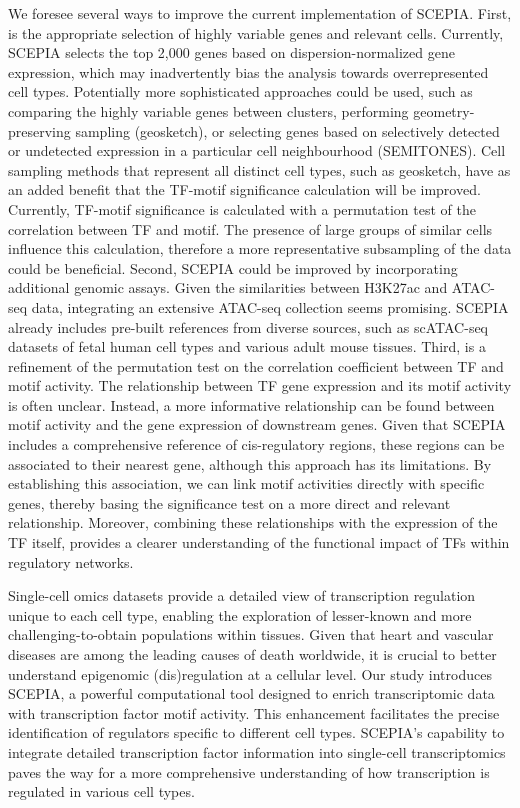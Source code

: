 We foresee several ways to improve the current implementation of SCEPIA. First, is the appropriate selection of highly variable genes and relevant cells. Currently, SCEPIA selects the top 2,000 genes based on dispersion-normalized gene expression, which may inadvertently bias the analysis towards overrepresented cell types. Potentially more sophisticated approaches could be used, such as comparing the highly variable genes between clusters, performing geometry-preserving sampling (geosketch)\cite{Hie2019}, or selecting genes based on selectively detected or undetected expression in a particular cell neighbourhood (SEMITONES)\cite{Vlot2022}. Cell sampling methods that represent all distinct cell types, such as geosketch, have as an added benefit that the TF-motif significance calculation will be improved. Currently, TF-motif significance is calculated with a permutation test of the correlation between TF and motif. The presence of large groups of similar cells influence this calculation, therefore a more representative subsampling of the data could be beneficial. Second, SCEPIA could be improved by incorporating additional genomic assays. Given the similarities between H3K27ac and ATAC-seq data, integrating an extensive ATAC-seq collection seems promising. SCEPIA already includes pre-built references from diverse sources, such as scATAC-seq datasets of fetal human cell types\cite{Domcke2020} and various adult mouse tissues\cite{Cusanovich2018}. Third, is a refinement of the permutation test on the correlation coefficient between TF and motif activity. The relationship between TF gene expression and its motif activity is often unclear. Instead, a more informative relationship can be found between motif activity and the gene expression of downstream genes. Given that SCEPIA includes a comprehensive reference of cis-regulatory regions, these regions can be associated to their nearest gene, although this approach has its limitations\cite{Fulco_2019}. By establishing this association, we can link motif activities directly with specific genes, thereby basing the significance test on a more direct and relevant relationship. Moreover, combining these relationships with the expression of the TF itself, provides a clearer understanding of the functional impact of TFs within regulatory networks.

Single-cell omics datasets provide a detailed view of transcription regulation unique to each cell type, enabling the exploration of lesser-known and more challenging-to-obtain populations within tissues. Given that heart and vascular diseases are among the leading causes of death worldwide\cite{Tsao2023}, it is crucial to better understand epigenomic (dis)regulation at a cellular level. Our study introduces SCEPIA, a powerful computational tool designed to enrich transcriptomic data with transcription factor motif activity. This enhancement facilitates the precise identification of regulators specific to different cell types. SCEPIA's capability to integrate detailed transcription factor information into single-cell transcriptomics paves the way for a more comprehensive understanding of how transcription is regulated in various cell types.

